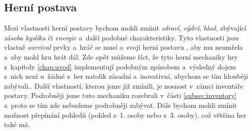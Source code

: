 \subsection{Herní postava}
Mezi vlastnosti herní postavy bychom mohli zmínit \textit{zdraví}, \textit{výdrž}, \textit{hlad}, zbývající \textit{zásoba kyslíku} či \textit{energie} a~další podobné charakteristiky. Tyto vlastnosti jsou vlastně \textit{survival} prvky a~hráč se musí o~svoji herní postavu , aby mu neumřela a~aby mohl hru hrát dál. Zde opět můžeme říct, že tyto herní mechaniky hry z~kapitoly \ref{chap:uvod} implementují podobným způsobem a~výsledný dojem z~nich není u~žádné z~her natolik zásadní a~inovativní, abychom se tím hlouběji zabývali..
Další vlastností, kterou jsme již zmínili, je nosnost v~rámci inventáře postavy. Podrobněji jsme tuto mechaniku rozebrali v~části \ref{subsec:inventory} a~proto se tím zde nebudeme podrobněji zabývat. 
Dále bychom mohli zmínit možnost přepínání pohledů (pohled z~1. osoby nebo z~3. osoby), což většina her také má. 


